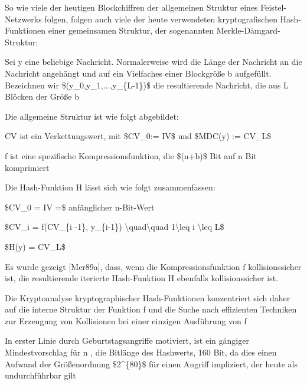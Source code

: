 \documentclass[a4paper]{article}
\begin{document}
\begin{multicols}{3}
      \begin{itemize*}
            \item So wie viele der heutigen Blockchiffren der allgemeinen Struktur eines
            Feistel-Netzwerks folgen, folgen auch viele der heute verwendeten
            kryptografischen Hash-Funktionen einer gemeinsamen Struktur, der
            sogenannten Merkle-Dåmgard-Struktur:
            \begin{itemize*}
                  \item Sei y eine beliebige Nachricht. Normalerweise wird die Länge der Nachricht an die Nachricht angehängt und auf ein Vielfaches einer Blockgröße b aufgefüllt. Bezeichnen wir \$(y\_0,y\_1,...,y\_\{L-1\})\$ die resultierende Nachricht, die aus L Blöcken der Größe b
                  \item Die allgemeine Struktur ist wie folgt abgebildet: %
                  \item CV ist ein Verkettungswert, mit \$CV\_0:= IV\$ und \$MDC(y) := CV\_L\$
                  \item f ist eine spezifische Kompressionsfunktion, die \$(n+b)\$ Bit auf n Bit komprimiert
            \end{itemize*}
            \item Die Hash-Funktion H lässt sich wie folgt zusammenfassen:
            \begin{itemize*}
                  \item \$CV\_0 = IV =\$ anfänglicher n-Bit-Wert
                  \item \$CV\_i = f(CV\_\{i -1\}, y\_\{i-1\}) \textbackslash quad\textbackslash quad 1\textbackslash leq i \textbackslash leq L\$
                  \item \$H(y) = CV\_L\$
            \end{itemize*}
            \item Es wurde gezeigt {[}Mer89a{]}, dass, wenn die Kompressionsfunktion f
            kollisionssicher ist, die resultierende iterierte Hash-Funktion H
            ebenfalls kollisionssicher ist.
            \item Die Kryptoanalyse kryptographischer Hash-Funktionen konzentriert sich
            daher auf die interne Struktur der Funktion f und die Suche nach
            effizienten Techniken zur Erzeugung von Kollisionen bei einer einzigen
            Ausführung von f
            \item In erster Linie durch Geburtstagsangriffe motiviert, ist ein gängiger
            Mindestvorschlag für n , die Bitlänge des Hashwerts, 160 Bit, da dies
            einen Aufwand der Größenordnung \$2\^{}\{80\}\$ für einen Angriff
            impliziert, der heute als undurchführbar gilt
      \end{itemize*}



\end{multicols}
\end{document}
